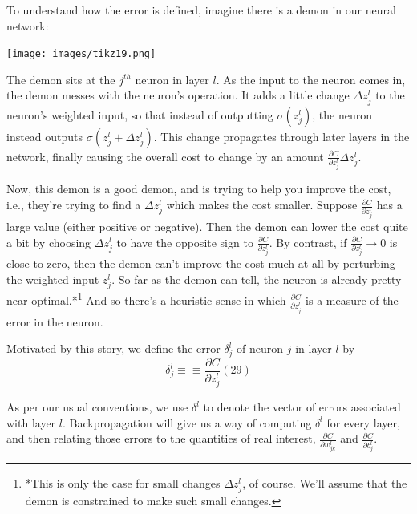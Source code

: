 \documentclass[a4paper,12pt]{report}%
\begin{document}
To understand how the error is defined, imagine there is a demon in our neural network:

\begin{center}
 \texttt{[image: images/tikz19.png]}
\end{center}

The demon sits at the $j^{th}$ neuron in layer $l$. As the input to the neuron comes in, the demon messes with the neuron's operation. It adds a little change $\Delta z^{l}_{j}$ to the neuron's weighted input, so that instead of outputting $\sigma(z_{j}^{l})$, the neuron instead outputs $\sigma(z_{j}^{l} + \Delta z_{j}^{l})$. This change propagates through later layers in the network, finally causing the overall cost to change by an amount $\frac{\partial C} {\partial z^{l}_{j}} \Delta z^{l}_{j}$.

Now, this demon is a good demon, and is trying to help you improve the cost, i.e., they're trying to find a $\Delta z^{l}_{j}$ which makes the cost smaller. Suppose $\frac{\partial C}{\partial z_{j}^{l}}$ has a large value (either positive or negative). Then the demon can lower the cost quite a bit by choosing $\Delta z_{j}^{l}$ to have the opposite sign to $\frac{\partial C}{\partial z_{j}^{l}}$. By contrast, if $\frac{\partial C}{\partial z_{j}^{l}} \rightarrow 0$ is close to zero, then the demon can't improve the cost much at all by perturbing the weighted input $z_{j}^{l}$. So far as the demon can tell, the neuron is already pretty near optimal.*\footnote{\color{blue}*This is only the case for small changes $\Delta z_{j}^{l}$, of course. We'll assume that the demon is constrained to make such small changes.} And so there's a heuristic sense in which $\frac{\partial C}{\partial z_{j}^{l}}$ is a measure of the error in the neuron.

Motivated by this story, we define the error $\delta_{j}^{l}$ of neuron $j$ in layer $l$ by
\begin{equation}
 \delta_{j}^{l} \equiv ≡ \frac{\partial C}{\partial z_{j}^{l}} (29)
\end{equation}

As per our usual conventions, we use $\delta^{l}$ to denote the vector of errors associated with layer $l$. Backpropagation will give us a way of computing $\delta^{l}$ for every layer, and then relating those errors to the quantities of real interest, $\frac{\partial C}{\partial w_{jk}^{l}}$ and $\frac{\partial C}{\partial b_{j}^{l}}$.
\end{document}
